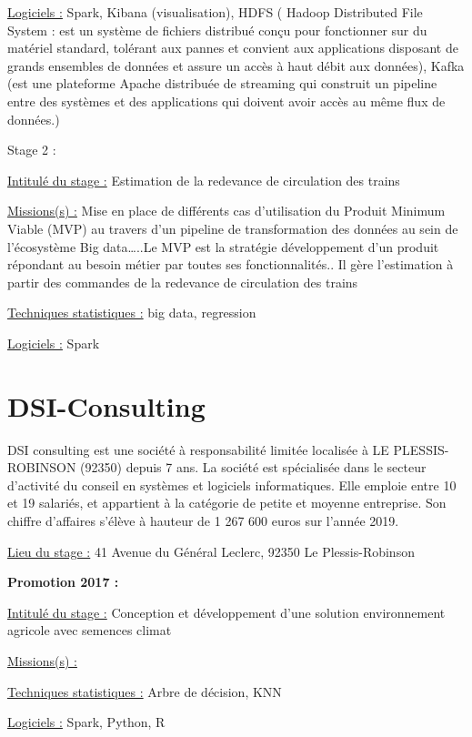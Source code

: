 \documentclass[
  letterpaper,
  DIV=11,
  numbers=noendperiod]{scrreprt}
\begin{document}
\uline{Logiciels :} Spark, Kibana (visualisation), HDFS ( Hadoop
Distributed File System : est un système de fichiers distribué conçu
pour fonctionner sur du matériel standard, tolérant aux pannes et
convient aux applications disposant de grands ensembles de données et
assure un accès à haut débit aux données), Kafka (est une plateforme
Apache distribuée de streaming qui construit un pipeline entre des
systèmes et des applications qui doivent avoir accès au même flux de
données.)

Stage 2 :

\uline{Intitulé du stage :} Estimation de la redevance de circulation
des trains

\uline{Missions(s) :} Mise en place de différents cas d'utilisation du
Produit Minimum Viable (MVP) au travers d'un pipeline de transformation
des données au sein de l'écosystème Big data\ldots..Le MVP est la
stratégie développement d'un produit répondant au besoin métier par
toutes ses fonctionnalités.. Il gère l'estimation à partir des commandes
de la redevance de circulation des trains

\uline{Techniques statistiques :} big data, regression

\uline{Logiciels :} Spark

\hypertarget{dsi-consulting}{%
\section{\texorpdfstring{\textbf{DSI-Consulting}}{DSI-Consulting}}\label{dsi-consulting}}

DSI consulting est une société à responsabilité limitée localisée à LE
PLESSIS-ROBINSON (92350) depuis 7 ans. La société est spécialisée dans
le secteur d'activité du conseil en systèmes et logiciels informatiques.
Elle emploie entre 10 et 19 salariés, et appartient à la catégorie de
petite et moyenne entreprise. Son chiffre d'affaires s'élève à hauteur
de 1 267 600 euros sur l'année 2019.

\uline{Lieu du stage :} 41 Avenue du Général Leclerc, 92350 Le
Plessis-Robinson

\textbf{Promotion 2017 :}

\uline{Intitulé du stage :} Conception et développement d'une solution
environnement agricole avec semences climat

\uline{Missions(s) :}

\uline{Techniques statistiques :} Arbre de décision, KNN

\uline{Logiciels :} Spark, Python, R
\end{document}
